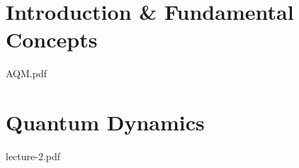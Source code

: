 \documentclass[beamer]{NoteBeamer}
\author{Axia}
\begin{document}

\chapter{Introduction \& Fundamental Concepts}{AQM.pdf}
   
\chapter{Quantum Dynamics}{lecture-2.pdf}

\clearnote
\end{document}
